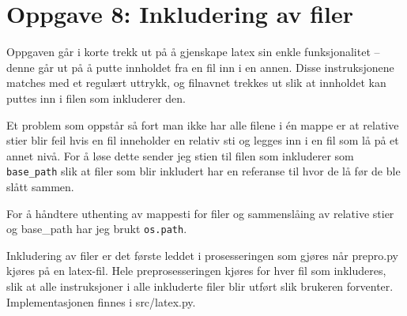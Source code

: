 \section*{Oppgave 8: Inkludering av filer}

Oppgaven går i korte trekk ut på å gjenskape latex sin enkle \-funksjonalitet – denne går ut på å putte innholdet fra en fil inn i en annen. Disse instruksjonene matches med et regulært uttrykk, og filnavnet trekkes ut slik at innholdet kan puttes inn i filen som inkluderer den.

Et problem som oppstår så fort man ikke har alle filene i én mappe er at relative stier blir feil hvis en fil inneholder en relativ sti og legges inn i en fil som lå på et annet nivå. For å løse dette sender jeg stien til filen som inkluderer som \verb;base_path; slik at filer som blir inkludert har en referanse til hvor de lå før de ble slått sammen.

For å håndtere uthenting av mappesti for filer og sammenslåing av relative stier og base\_path har jeg brukt \verb;os.path;.

Inkludering av filer er det første leddet i prosesseringen som gjøres når prepro.py kjøres på en latex-fil. Hele preprosesseringen kjøres for hver fil som inkluderes, slik at alle instruksjoner i alle inkluderte filer blir utført slik brukeren forventer. Implementasjonen finnes i src/latex.py.